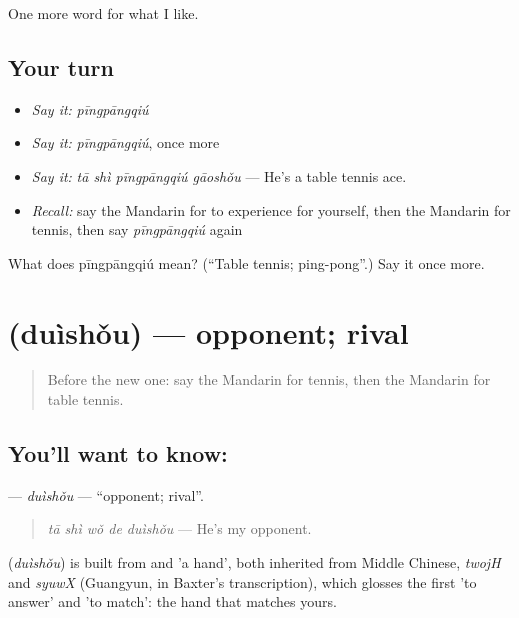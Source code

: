 \begin{grammarlens}[title={What you've built}]
One more word for what I like.
\end{grammarlens}

\subsection*{Your turn}
\begin{itemize}
\raggedright
  \item \emph{Say it:} \emph{pīngpāngqiú}
  \item \emph{Say it:} \emph{pīngpāngqiú}, once more
  \item \emph{Say it:} \emph{tā shì pīngpāngqiú gāoshǒu} — He's a table tennis ace.
  \item \emph{Recall:} say the Mandarin for to experience for yourself, then the Mandarin for tennis, then say \emph{pīngpāngqiú} again
\end{itemize}

\begin{tcolorbox}[breakable,colback=teal!4,colframe=teal!35!black,title={Before you move on}]
What does pīngpāngqiú mean? (\textquotedblleft{}Table tennis; ping-pong\textquotedblright{}.) Say it once more.
\end{tcolorbox}
\section[\texorpdfstring{\zh{对手} (duìshǒu)}{对手 (duìshǒu)}]{ (duìshǒu) — opponent; rival}

\label{lesson:ZH-C262-duishou}



\begin{quote}
Before the new one: say the Mandarin for tennis, then the Mandarin for table tennis.
\end{quote}

\subsection*{You'll want to know: }
\textbf{} — \emph{duìshǒu} — \textquotedblleft{}opponent; rival\textquotedblright{}.

\begin{quote}
\textbf{} \emph{tā shì wǒ de duìshǒu} — He's my opponent.
\end{quote}

\begin{cousinweb}
\textbf{} (\emph{duìshǒu}) is built from  and  'a hand', both inherited from Middle Chinese, \emph{twojH} and \emph{syuwX} (Guangyun, in Baxter's transcription), which glosses the first 'to answer' and 'to match': the hand that matches yours.
\end{cousinweb}

